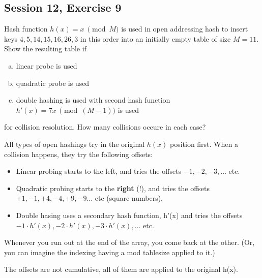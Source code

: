 \subsection {Session 12, Exercise 9}
\label{13f9}


Hash function $h(x) = x~ \pmod{M}$ is used in open addressing hash to insert keys $4,5,14,15,16,26,3$ in this
order into an initially empty table of size $M = 11$. Show the resulting table if

\begin{enumerate}[a)]
    \item linear probe is used
    \item quadratic probe is used
    \item double hashing is used with second hash function $h'(x) = 7x~ \pmod{(M-1)}$ is used
\end{enumerate}

for collision resolution. How many collisions occure in each case?



All types of open hashings try in the original $h(x)$ position first. When a collision happens, they try the following offsets:

\begin{itemize}
    \item Linear probing starts to the left, and tries the offsets $-1, -2, -3, \dots$ etc.
    \item Quadratic probing starts to the \textbf{right} (!), and tries the offsets $+1, -1, +4, -4,  +9, -9 \dots$ etc (square numbers).
    \item Double hasing uses a secondary hash function, h'(x) and tries the offsets $-1\cdot{}h'(x), -2\cdot{}h'(x), -3\cdot{}h'(x), \dots$ etc.
\end{itemize}

Whenever you run out at the end of the array, you come back at the other. (Or, you can imagine the indexing having a mod tablesize applied to it.)

The offsets are not cumulative, all of them are applied to the original h(x).

